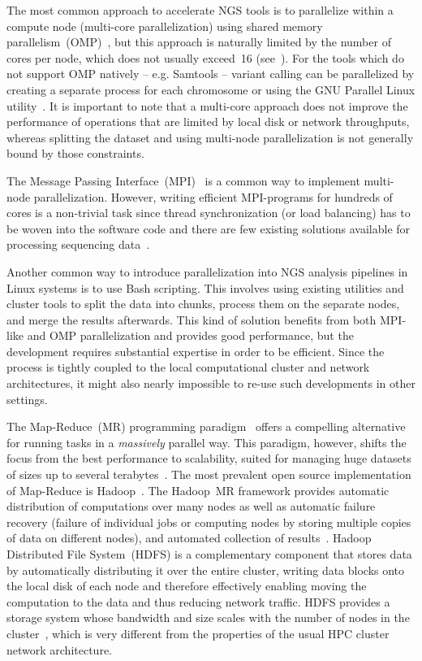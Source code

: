 \documentclass[10pt]{article}
\begin{document}
The most common approach to accelerate NGS tools is to parallelize within a compute node (multi-core parallelization) using shared memory parallelism~(OMP)~\cite{openmp}, but this approach is naturally limited by the number of cores per node, which does not usually exceed~16 (see~\cite{top500}). For the tools which do not support OMP natively -- e.g. Samtools -- variant calling can be parallelized by creating a separate process for each chromosome or using the GNU Parallel Linux utility~\cite{Tange2011a}.
It is important to note that a multi-core approach does not improve the performance of operations that are limited by local disk or network throughputs, whereas splitting the dataset and using multi-node parallelization is not generally bound by those constraints.

The Message Passing Interface~(MPI)~\cite{mpi1} is a common way to implement multi-node parallelization. However, writing efficient MPI-programs for hundreds of cores is a non-trivial task since thread synchronization (or load balancing) has to be woven into the software code and there are few existing solutions available for processing sequencing data~\cite{pmap, erne, gnumap}.

Another common way to introduce parallelization into NGS analysis pipelines in Linux systems is to use Bash scripting. This involves using existing utilities and cluster tools to split the data into chunks, process them on the separate nodes, and merge the results afterwards. This kind of solution benefits from both MPI-like and OMP parallelization and provides good performance, but the development requires substantial expertise in order to be efficient. Since the process is tightly coupled to the local computational cluster and network architectures, it might also nearly impossible to re-use such developments in other settings.

The Map-Reduce~(MR) programming paradigm~\cite{dean.2004.mapreduce} offers a compelling alternative for running tasks in a {\it massively} parallel way. This paradigm, however, shifts the focus from the best performance to scalability, suited for managing huge datasets of sizes up to several terabytes~\cite{lin2010}.
The most prevalent open source implementation of Map-Reduce is Hadoop~\cite{hadoop,Hadoop:Guide}.
The Hadoop~MR framework provides automatic distribution of computations over many nodes as well as automatic failure recovery (failure of individual jobs or computing nodes by storing multiple copies of data on different nodes), and automated collection of results~\cite{Hadoop:Guide}. Hadoop Distributed File System~(HDFS) is a complementary component that stores data by automatically distributing it over the entire cluster, writing data blocks onto the local disk of each node and therefore effectively enabling moving the computation to the data and thus reducing network traffic. HDFS provides a storage system whose bandwidth and size scales with the number of nodes in the cluster~\cite{Sammer:2012}, which is very different from the properties of the usual HPC cluster network architecture.
\end{document}

